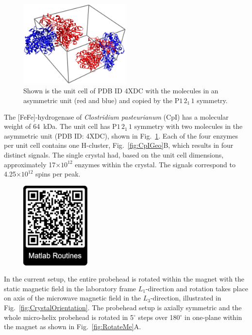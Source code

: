 \begin{figure}[htbp]
\centering
 \includegraphics[width=0.5\textwidth]{Kapitel/Ch6-Images/Ch6-UnitCell.eps}
 \caption[Unit Cell from PDB 4XDC.]{Shown is the unit cell of PDB ID 4XDC with the molecules in an asymmetric unit (red and blue) and copied by the P$1\,2_1\,1$ symmetry.} 
 \label{fig:xTalFeFeUnit}
\end{figure}

The [FeFe]-hydrogenase of \textit{Clostridium pasteurianum} (CpI) has a molecular weight of 64~kDa. The unit cell has P$1\,2_1\,1$ symmetry with two molecules in the asymmetric unit (PDB ID: 4XDC), shown in Fig.~\ref{fig:xTalFeFeUnit}. Each of the four enzymes per unit cell contains one H-cluster, Fig.~\ref{fig:CpIGeo}B, which results in four distinct signals. The single crystal had, based on the unit cell dimensions, approximately 17$\times10^{12}$ enzymes within the crystal. The signals correspond to 4.25$\times10^{12}$ spins per peak. 

\begin{figure}
\centering
\includegraphics[width=3.5cm]{Kapitel/Appendix/eFitRoutinesQR.eps}
\end{figure}

In the current setup, the entire probehead is rotated within the magnet with the static magnetic field in the laboratory frame $L_1$-direction and rotation takes place on axis of the microwave magnetic field in the $L_3$-direction, illustrated in Fig.~\ref{fig:CrystalOrientation}. The probehead setup is axially symmetric and the whole micro-helix probehead is rotated in 5$^{\circ}$ steps over 180$^{\circ}$ in one-plane within the magnet as shown in Fig.~\ref{fig:RotateMe}A.

